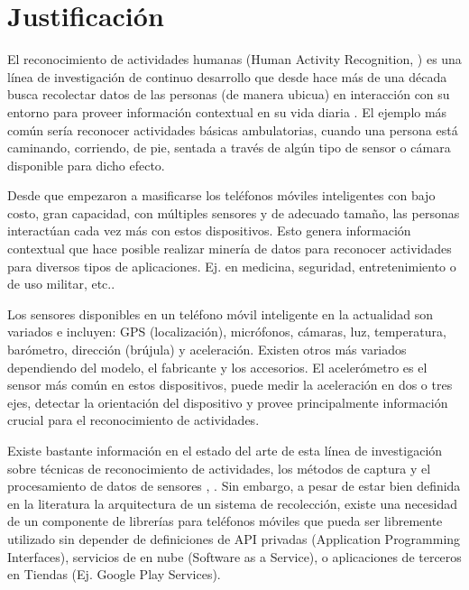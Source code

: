 \section{Justificación\label{justificaciuxf3n}}

El reconocimiento de actividades humanas (Human Activity Recognition,
)
es una línea de investigación de continuo desarrollo que desde hace
más de una década busca recolectar datos de las personas (de manera
ubicua) en interacción con su entorno para proveer información contextual
en su vida diaria \cite{Bao2004}. El ejemplo más común sería reconocer
actividades básicas ambulatorias, cuando una persona está caminando,
corriendo, de pie, sentada a través de algún tipo de sensor o cámara
disponible para dicho efecto.

Desde que empezaron a masificarse los teléfonos móviles inteligentes
con bajo costo, gran capacidad, con múltiples sensores y de adecuado
tamaño, las personas interactúan cada vez más con estos dispositivos.
Esto genera información contextual que hace posible realizar minería
de datos para reconocer actividades para diversos tipos de aplicaciones.
Ej. en medicina, seguridad, entretenimiento o de uso militar, etc.\cite{LaraLabrador2013}.

Los sensores disponibles en un teléfono móvil inteligente en la actualidad
son variados e incluyen: GPS (localización), micrófonos, cámaras,
luz, temperatura, barómetro, dirección (brújula) y aceleración. Existen
otros más variados dependiendo del modelo, el fabricante y los accesorios.
El acelerómetro es el sensor más común en estos dispositivos, puede
medir la aceleración en dos o tres ejes, detectar la orientación del
dispositivo y provee principalmente información crucial para el reconocimiento
de actividades.

Existe bastante información en el estado del arte de esta línea de
investigación sobre técnicas de reconocimiento de actividades, los
métodos de captura y el procesamiento de datos de sensores \cite{LaraLabrador2012},
\cite{Kwapisz2011}. Sin embargo, a pesar de estar bien definida en
la literatura la arquitectura de un sistema de recolección, existe
una necesidad de un componente de librerías para teléfonos móviles
que pueda ser libremente utilizado sin depender de definiciones de
API privadas (Application Programming Interfaces), servicios de en
nube (Software as a Service), o aplicaciones de terceros en Tiendas
(Ej. Google Play Services).


